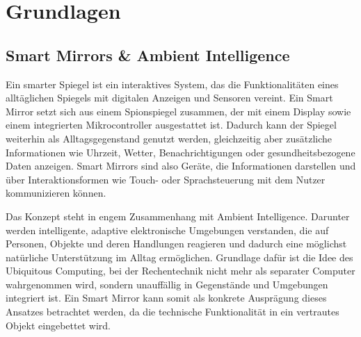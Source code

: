 
\chapter{Grundlagen}
\label{chap:grundlagen}
\section{Smart Mirrors \& Ambient Intelligence}
Ein smarter Spiegel ist ein interaktives System, das die Funktionalitäten eines alltäglichen Spiegels mit digitalen Anzeigen und Sensoren vereint.
Ein Smart Mirror setzt sich aus einem Spionspiegel zusammen, der mit einem Display sowie einem integrierten Mikrocontroller ausgestattet ist.
Dadurch kann der Spiegel weiterhin als Alltagsgegenstand genutzt werden, gleichzeitig aber zusätzliche Informationen wie Uhrzeit, Wetter, Benachrichtigungen oder gesundheitsbezogene Daten anzeigen. Smart Mirrors sind also Geräte, die Informationen darstellen und über Interaktionsformen wie Touch- oder Sprachsteuerung mit dem Nutzer kommunizieren können.

Das Konzept steht in engem Zusammenhang mit Ambient Intelligence. Darunter werden intelligente, adaptive elektronische Umgebungen verstanden, die auf Personen, Objekte und deren Handlungen reagieren und dadurch eine möglichst natürliche Unterstützung im Alltag ermöglichen. Grundlage dafür ist die Idee des Ubiquitous Computing, bei der Rechentechnik nicht mehr als separater Computer wahrgenommen wird, sondern unauffällig in Gegenstände und Umgebungen integriert ist. Ein Smart Mirror kann somit als konkrete Ausprägung dieses Ansatzes betrachtet werden, da die technische Funktionalität in ein vertrautes Objekt eingebettet wird.

